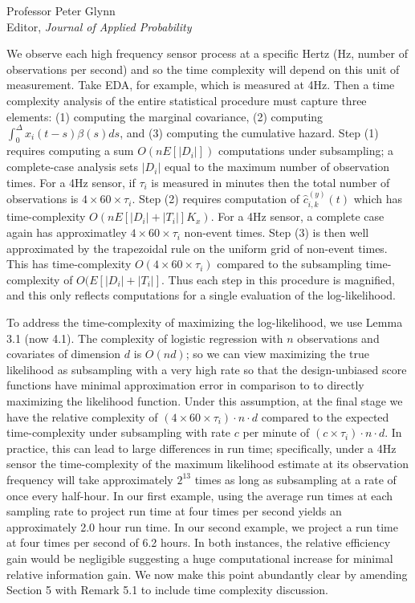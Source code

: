 \documentclass[11pt]{letter} %
\begin{document}
\begin{letter}{Professor
	Peter Glynn\\
	Editor, {\em Journal of Applied Probability}}
\begin{enumerate}
We observe each high frequency sensor process at a specific Hertz (Hz, number of observations per second) and so the time complexity will depend on this unit of measurement.  Take EDA, for example, which is measured at 4Hz.  Then a time complexity analysis of the entire statistical procedure must capture three elements: (1) computing the marginal covariance, (2) computing $\int_{0}^\Delta x_i (t-s) \beta(s) ds$, and (3) computing the cumulative hazard.  Step (1) requires computing a sum $O(n E\left[|D_i| \right])$ computations under subsampling; a complete-case analysis sets $|D_i|$ equal to the maximum number of observation times.  For a 4Hz sensor, if $\tau_i$ is measured in minutes then the total number of observations is $4 \times 60 \times \tau_i$.  Step (2) requires computation of $\hat c_{i,k}^{(y)} (t)$ which has time-complexity $O(n E \left[ |D_i| + |T_i| \right] K_x)$.  For a 4Hz sensor, a complete case again has approximatley $4 \times 60 \times \tau_i$ non-event times.  Step (3) is then well approximated by the trapezoidal rule on the uniform grid of non-event times.  This has time-complexity $O(4 \times 60 \times \tau_i)$ compared to the subsampling time-complexity of $O(E \left[ |D_i|  + |T_i| \right]$.  Thus each step in this procedure is magnified, and this only reflects computations for a single evaluation of the log-likelihood.
\vspace{5mm}

To address the time-complexity of maximizing the log-likelihood, we use Lemma 3.1 (now 4.1).  The complexity of logistic regression with $n$ observations and covariates of dimension $d$ is $O(nd)$; so we can view maximizing the true likelihood as subsampling with a very high rate so that the design-unbiased score functions have minimal approximation error in comparison to to directly maximizing the likelihood function.  Under this assumption, at the final stage we have the relative complexity of $(4 \times 60 \times \tau_i) \cdot n \cdot d$ compared to the expected time-complexity under subsampling with rate $c$ per minute of $(c \times \tau_i) \cdot n \cdot d$.  In practice, this can lead to large differences in run time; specifically, under a 4Hz sensor the time-complexity of the maximum likelihood estimate at its observation frequency will take approximately $2^{13}$ times as long as subsampling at a rate of once every half-hour.  In our first example, using the average run times at each sampling rate to project run time at four times per second yields an approximately 2.0 hour run time. In our second example, we project a run time at four times per second of 6.2 hours. In both instances, the relative efficiency gain would be negligible suggesting a huge computational increase for minimal relative information gain. We now make this point abundantly clear by amending Section 5 with Remark 5.1 to include time complexity discussion.



\end{enumerate}
\end{letter}
\end{document}
